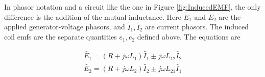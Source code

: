 \documentclass{ximera}
\begin{document}
In phasor notation and a circuit like the one in Figure \ref{fig:InducedEMF}, the only difference is the addition of the mutual inductance. Here $\tilde{E}_1$ and $\tilde{E}_2$ are the applied generator-voltage phasors, and $\tilde{I}_1,\tilde{I}_2$ are current phasors. The induced coil emfs are the separate quantities $e_1,e_2$ defined above. The equations are



\begin{eqnarray}
\tilde{E_1} = (R + j \omega L_1) \tilde{I_1} \pm j \omega L_{12} \tilde{I_2} \\
\tilde{E_2} = (R + j \omega L_2) \tilde{I_2} \pm j \omega L_{21} \tilde{I_1}
\end{eqnarray}
\end{document}
